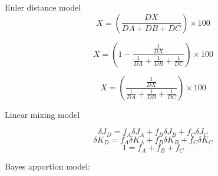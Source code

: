 \documentclass{article}
\begin{document}
Euler distance model
\begin{displaymath}
X = \left(\frac{DX}{DA + DB + DC}\right)\times100
\end{displaymath}

\begin{displaymath}
X = \left(1-\frac{\frac{1}{DX}}{\frac{1}{DA} + \frac{1}{DB} + \frac{1}{DC}}\right)\times100
\end{displaymath}

\begin{displaymath}
X = \left(\frac{\frac{1}{DX}}{\frac{1}{DA} + \frac{1}{DB} + \frac{1}{DC}}\right)\times100
\end{displaymath}

Linear mixing model

\begin{displaymath}
\delta J_{D} = f_{A}\delta J_{A} + f_{B}\delta J_{B} + f_{C}\delta J_{C}
\end{displaymath}
\begin{displaymath}
\delta K_{D} = f_{A}\delta K_{A} + f_{B}\delta K_{B} + f_{C}\delta K_{C}
\end{displaymath}
\begin{displaymath}
1 = f_{A} + f_{B} + f_{C}
\end{displaymath}

Bayes apportion model:
\end{document}
